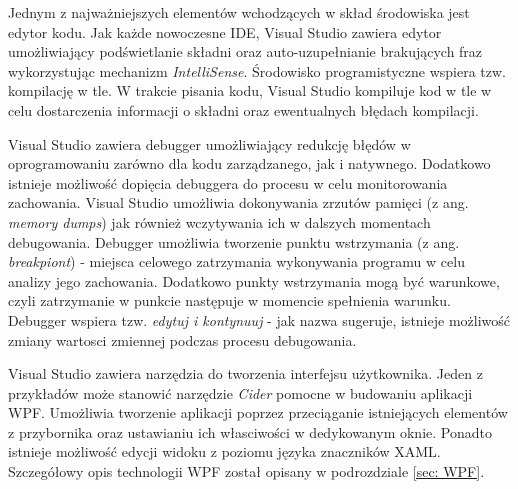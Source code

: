 Jednym z najważniejszych elementów wchodzących w skład środowiska jest edytor kodu. Jak każde nowoczesne IDE, Visual Studio zawiera edytor umożliwiający podświetlanie składni oraz auto-uzupełnianie brakujących fraz wykorzystując mechanizm \textit{IntelliSense}. Środowisko programistyczne wspiera tzw. kompilację w tle. W trakcie pisania kodu, Visual Studio kompiluje kod w tle w celu dostarczenia informacji o składni oraz ewentualnych błędach kompilacji. 

Visual Studio zawiera debugger umożliwiający redukcję błędów w oprogramowaniu zarówno dla kodu zarządzanego, jak i natywnego. Dodatkowo istnieje możliwość dopięcia debuggera do procesu w celu monitorowania zachowania. Visual Studio umożliwia dokonywania zrzutów pamięci (z ang. \textit{memory dumps}) jak również wczytywania ich w dalszych momentach debugowania. Debugger umożliwia tworzenie punktu wstrzymania (z ang. \textit{breakpiont}) - miejsca celowego zatrzymania wykonywania programu w celu analizy jego zachowania. Dodatkowo punkty wstrzymania mogą być warunkowe, czyli zatrzymanie w punkcie następuje w momencie spełnienia warunku. Debugger wspiera tzw. \textit{edytuj i kontynuuj} - jak nazwa sugeruje, istnieje możliwość zmiany wartosci zmiennej podczas procesu debugowania.

Visual Studio zawiera narzędzia do tworzenia interfejsu użytkownika. Jeden z przykładów może stanowić narzędzie \textit{Cider} pomocne w budowaniu aplikacji WPF. Umożliwia tworzenie aplikacji poprzez przeciąganie istniejących elementów z przybornika oraz ustawianiu ich własciwości w dedykowanym oknie. Ponadto istnieje możliwość edycji widoku z poziomu języka znaczników XAML. Szczegółowy opis technologii WPF został opisany w podrozdziale \ref{sec: WPF}.
















